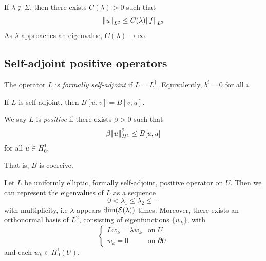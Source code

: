 \documentclass{article}
\begin{document}
\begin{remark}
    If \(\lambda \notin \Sigma\), then there exists \(C(\lambda) > 0\) such that
    \[\norm{u}_{L^2} \le C(\lambda)\norm{f}_{L^2}\]  
    As \(\lambda\) approaches an eigenvalue, \(C(\lambda) \to \infty\).  
\end{remark}

\subsection{Self-adjoint positive operators}

\begin{definition}
    The operator \(L\) is \emph{formally self-adjoint} if \(L = L^\dagger\). Equivalently, \(b^i = 0\) for all \(i\).
\end{definition}

If \(L\) is self adjoint, then \(B[u, v] = B[v, u]\).

\begin{definition}
    [positive] We say \(L\) is \emph{positive} if there exists \(\beta > 0\) such that
    \[\beta\norm{u}^2_{H^1} \le B[u, u]\]
    for all \(u \in H^1_0\).
\end{definition}
That is, \(B\) is coercive.

\lec

\begin{theorem}
     Let \(L\) be uniformly elliptic, formally self-adjoint, positive operator on \(U\). Then we can represent the eigenvalues of \(L\) as a sequence
    \[0 < \lambda_1 \le \lambda_2 \le \cdots\]
    with multiplicity, i.e \(\lambda\) appears \(\dim(\mathcal{E}(\lambda))\) times. Moreover, there exists an orthonormal basis of \(L^2\), consisting of eigenfunctions \(\{w_k\}\), with
    \[\begin{cases}
        Lw_k = \lambda w_k & \text{on }U \\
        w_k = 0 &\text{on }\partial U
    \end{cases}\]
    and each \(w_k \in H^1_0(U)\).
\end{theorem}
\end{document}
